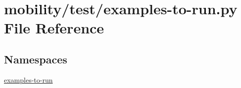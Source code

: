 \hypertarget{mobility_2test_2examples-to-run_8py}{}\section{mobility/test/examples-\/to-\/run.py File Reference}
\label{mobility_2test_2examples-to-run_8py}
\subsection*{Namespaces}
\begin{DoxyCompactItemize}
\item 
 \hyperlink{namespaceexamples-to-run}{examples-\/to-\/run}
\end{DoxyCompactItemize}
